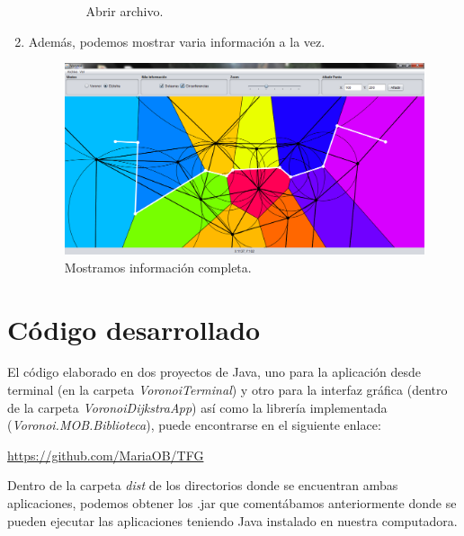 \begin{enumerate}
\begin{enumerate}
\begin{figure}[H]
\begin{center}
{                } 
                 \end{center}
                \caption{Abrir archivo.} \label{fig:incre}
            \end{figure}                  
        \end{enumerate}             
        
        \item Además, podemos mostrar varia información a la vez.
        \begin{figure}  [H]
            \centering
            \includegraphics[scale=0.3]{imagenes/todo.png}
            \caption{Mostramos información completa.}
        \end{figure}
    \end{enumerate}
    

\section{Código desarrollado} \label{manual}

El código elaborado en dos proyectos de Java, uno para la aplicación desde terminal (en la carpeta \textit{VoronoiTerminal}) y otro para la interfaz gráfica (dentro de la carpeta \textit{VoronoiDijkstraApp}) así como la librería implementada (\textit{Voronoi.MOB.Biblioteca}), puede encontrarse en el siguiente enlace:
\hspace{0.3cm}

\begin{center} 
\url{https://github.com/MariaOB/TFG}
\end{center}

\hspace{0.3cm}
Dentro de la carpeta \textit{dist} de los directorios donde se encuentran ambas aplicaciones, podemos obtener los .jar que comentábamos anteriormente donde se pueden ejecutar las aplicaciones teniendo Java instalado en nuestra computadora.
